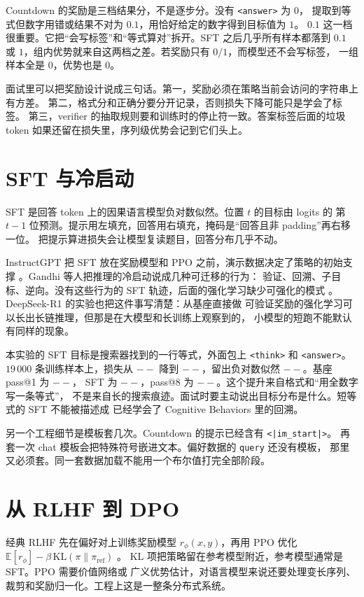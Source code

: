 \documentclass[10pt,twocolumn,a4paper]{ctexart}
\providecommand{\PassBaseOne}{--}\providecommand{\PassSftOne}{--}
\providecommand{\PassSftEight}{--}\providecommand{\SftLossStart}{--}
\providecommand{\SftLossEnd}{--}\providecommand{\SftEvalNll}{--}
\begin{document}
Countdown 的奖励是三档结果分，不是逐步分。没有 \texttt{<answer>} 为 $0$，
提取到等式但数字用错或结果不对为 $0.1$，用恰好给定的数字得到目标值为 $1$。
$0.1$ 这一档很重要。它把``会写标签''和``等式算对''拆开。SFT 之后几乎所有样本都落到
$0.1$ 或 $1$，组内优势就来自这两档之差。若奖励只有 $0/1$，而模型还不会写标签，
一组样本全是 $0$，优势也是 $0$。

面试里可以把奖励设计说成三句话。第一，奖励必须在策略当前会访问的字符串上有方差。
第二，格式分和正确分要分开记录，否则损失下降可能只是学会了标签。
第三，verifier 的抽取规则要和训练时的停止符一致。答案标签后面的垃圾 token
如果还留在损失里，序列级优势会记到它们头上。

\section{SFT 与冷启动}
SFT 是回答 token 上的因果语言模型负对数似然。位置 $t$ 的目标由 logits 的
第 $t-1$ 位预测。提示用左填充，回答用右填充，掩码是``回答且非 padding''再右移一位。
把提示算进损失会让模型复读题目，回答分布几乎不动。

InstructGPT 把 SFT 放在奖励模型和 PPO 之前，演示数据决定了策略的初始支撑
\citep{ouyang2022instructgpt}。Gandhi 等人把推理的冷启动说成几种可迁移的行为：
验证、回溯、子目标、逆向。没有这些行为的 SFT 轨迹，后面的强化学习缺少可强化的模式
\citep{gandhi2025cognitive}。DeepSeek-R1 的实验也把这件事写清楚：从基座直接做
可验证奖励的强化学习可以长出长链推理，但那是在大模型和长训练上观察到的，
小模型的短跑不能默认有同样的现象\citep{deepseek2025r1}。

本实验的 SFT 目标是搜索器找到的一行等式，外面包上 \texttt{<think>} 和
\texttt{<answer>}。$19\,000$ 条训练样本上，损失从 $\SftLossStart$ 降到
$\SftLossEnd$，留出负对数似然 $\SftEvalNll$。基座 pass@1 为 $\PassBaseOne$，
SFT 为 $\PassSftOne$，pass@8 为 $\PassSftEight$。这个提升来自格式和``用全数字写一条等式''，
不是来自长的搜索痕迹。面试时要主动说出目标分布是什么。短等式的 SFT 不能被描述成
已经学会了 Cognitive Behaviors 里的回溯。

另一个工程细节是模板套几次。Countdown 的提示已经含有 \texttt{<|im\_start|>}。
再套一次 chat 模板会把特殊符号嵌进文本。偏好数据的 \texttt{query} 还没有模板，
那里又必须套。同一套数据加载不能用一个布尔值打完全部阶段。

\section{从 RLHF 到 DPO}
经典 RLHF 先在偏好对上训练奖励模型 $r_\phi(x,y)$，再用 PPO 优化
$\mathbb{E}[r_\phi]-\beta\,\mathrm{KL}(\pi\|\pi_{\mathrm{ref}})$
\citep{ouyang2022instructgpt,schulman2017ppo,zheng2023secrets}。
KL 项把策略留在参考模型附近，参考模型通常是 SFT。PPO 需要价值网络或
广义优势估计\citep{schulman2015gae}，对语言模型来说还要处理变长序列、
裁剪和奖励归一化。工程上这是一整条分布式系统\citep{zheng2023secrets}。
\end{document}
